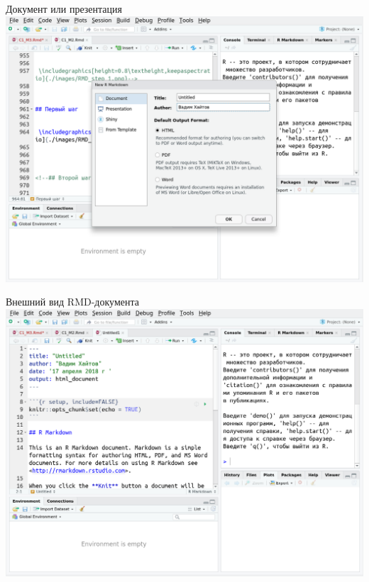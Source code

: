 \documentclass[
  10pt,
  ignorenonframetext,
  aspectratio=169,t,xcolor=table]{beamer}
\begin{document}
\begin{frame}{Документ или презентация}
\protect\hypertarget{ux434ux43eux43aux443ux43cux435ux43dux442-ux438ux43bux438-ux43fux440ux435ux437ux435ux43dux442ux430ux446ux438ux44f}{}
\includegraphics[height=0.7\textheight,keepaspectratio]{./images/RMD_step_2_Ira.png}
\end{frame}

\begin{frame}{Внешний вид RMD-документа}
\protect\hypertarget{ux432ux43dux435ux448ux43dux438ux439-ux432ux438ux434-rmd-ux434ux43eux43aux443ux43cux435ux43dux442ux430}{}
\includegraphics[height=0.7\textheight,keepaspectratio]{./images/RMD_step_3_Ira.png}
\end{frame}
\end{document}
